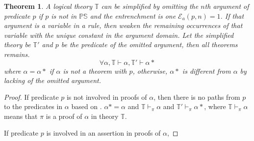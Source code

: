 \documentclass[11pt,letterpaper]{article}
\newtheorem{theorem}{Theorem}[section]
\newcommand{\ps}{\mathbb{PS}}
\newcommand{\theory}{\mathbb{T}}
\begin{document}
\begin{theorem}\label{the:ref:remarg}
A logical theory $\theory$ can be simplified by omitting the $n$th argument of predicate $p$ if $p$ is not in $\ps$ and the entrenchment is one $\mathcal{E}_{a}(p, n)=1$. If that argument is a variable in a rule, then weaken the remaining occurrences of that variable with the unique constant in the argument domain. Let the simplified theory be $\theory'$ and $p$ be the predicate of the omitted argument, then all theorems remains.
\begin{equation}
    \forall \alpha, \theory \vdash \alpha, \theory' \vdash \alpha*
\end{equation}
where $\alpha = \alpha*$ if $\alpha$ is not a theorem with $p$, otherwise, $\alpha*$ is different from $\alpha$ by lacking of the omitted argument.
\end{theorem}

\begin{proof}
If predicate $p$ is not involved in proofs of $\alpha$,  then there is no paths from $p$ to the predicates in $\alpha$ based on . $\alpha* = \alpha$ and $\theory \vdash_{\pi} \alpha$ and $\theory' \vdash_{\pi} \alpha*$, where $\theory\vdash_{\pi}\alpha$ means that $\pi$ is a proof of $\alpha$ in theory $\theory$.

If predicate $p$ is involved in an assertion in proofs of $\alpha$,

\end{proof}
\end{document}
